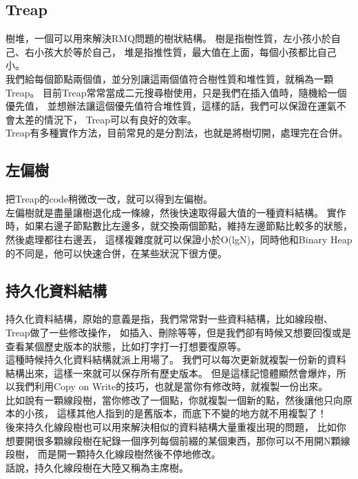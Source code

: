 \documentclass{article}
\begin{document}
\subsection{Treap}
樹堆，一個可以用來解決RMQ問題的樹狀結構。
樹是指樹性質，左小孩小於自己、右小孩大於等於自己，
堆是指推性質，最大值在上面，每個小孩都比自己小。\\
我們給每個節點兩個值，並分別讓這兩個值符合樹性質和堆性質，就稱為一顆Treap。
目前Treap常常當成二元搜尋樹使用，只是我們在插入值時，隨機給一個優先值，
並想辦法讓這個優先值符合堆性質，這樣的話，我們可以保證在運氣不會太差的情況下，
Treap可以有良好的效率。\\
Treap有多種實作方法，目前常見的是分割法，也就是將樹切開，處理完在合併。

\subsection{左偏樹}
把Treap的code稍微改一改，就可以得到左偏樹。\\
左偏樹就是盡量讓樹退化成一條線，然後快速取得最大值的一種資料結構。
實作時，如果右邊子節點數比左邊多，就交換兩個節點，維持左邊節點比較多的狀態，然後處理都往右邊丟，
這樣複雜度就可以保證小於O(lgN)，同時他和Binary Heap的不同是，他可以快速合併，在某些狀況下很方便。

\subsection{持久化資料結構}
持久化資料結構，原始的意義是指，我們常常對一些資料結構，比如線段樹、Treap做了一些修改操作，
如插入、刪除等等，但是我們卻有時候又想要回復或是查看某個歷史版本的狀態，比如打字打一打想要復原等。\\
這種時候持久化資料結構就派上用場了。
我們可以每次更新就複製一份新的資料結構出來，這樣一來就可以保存所有歷史版本。
但是這樣記憶體顯然會爆炸，所以我們利用Copy on Write的技巧，也就是當你有修改時，就複製一份出來。\\
比如說有一顆線段樹，當你修改了一個點，你就複製一個新的點，然後讓他只向原本的小孩，
這樣其他人指到的是舊版本，而底下不變的地方就不用複製了！\\

後來持久化線段樹也可以用來解決相似的資料結構大量重複出現的問題，
比如你想要開很多顆線段樹在紀錄一個序列每個前綴的某個東西，那你可以不用開N顆線段樹，
而是開一顆持久化線段樹然後不停地修改。\\

話說，持久化線段樹在大陸又稱為主席樹。
\end{document}
